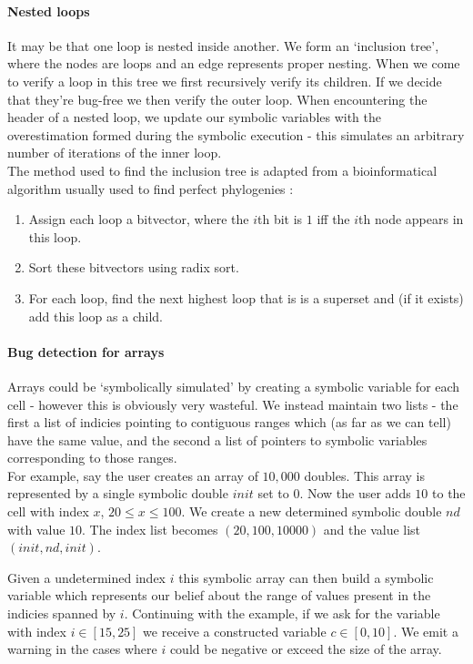\documentclass[12pt,a4paper]{article}
\begin{document}
\paragraph{Nested loops}
It may be that one loop is nested inside another. We form an `inclusion tree', where the nodes are loops and an edge represents proper nesting. When we come to verify a loop in this tree we first recursively verify its children.
If we decide that they're bug-free we then verify the outer loop. When encountering the header of a nested loop, we update our symbolic variables with the overestimation formed during
the symbolic execution - this simulates an arbitrary number of iterations of the inner loop.\\

The method used to find the inclusion tree is adapted from a bioinformatical algorithm usually used to find perfect phylogenies \citep{gusfield}:

\begin{enumerate}
\item Assign each loop a bitvector, where the $i$th bit is $1$ iff the $i$th node appears in this loop.
\item Sort these bitvectors using radix sort.
\item For each loop, find the next highest loop that is is a superset and (if it exists) add this loop as a child. 
\end{enumerate}

\paragraph{Bug detection for arrays}
Arrays could be `symbolically simulated' by creating a symbolic variable for each cell - however this is obviously very wasteful. We instead maintain two lists - 
the first a list of indicies pointing to contiguous ranges which (as far as we can tell) have the same value, and the second a list of pointers to symbolic variables corresponding to those ranges.\\
For example, say the user creates an array of $10,000$ doubles. This array is represented
by a single symbolic double $init$ set to 0. Now the user adds $10$ to the cell with index $x$, $20 \leq x \leq 100$. We create a new determined symbolic double $nd$ with value $10$.
The index list becomes $(20, 100, 10000)$ and the value list $(init, nd, init)$. 

Given a undetermined index $i$ this symbolic array can then build a symbolic variable which represents our belief about the range of values present in the indicies spanned by $i$. Continuing with the example,
if we ask for the variable with index $i \in [15, 25]$ we receive a constructed variable $c  \in [0, 10]$. We emit a warning in the cases where $i$ could be negative or exceed the size of the array. 
\end{document}
